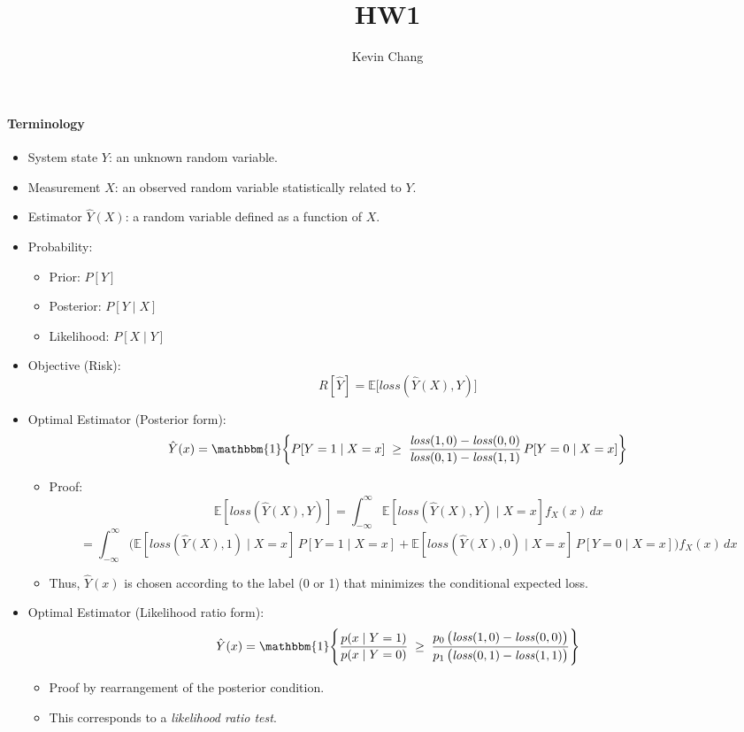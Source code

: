 \documentclass[a4paper]{article}
\title{HW1}
\author{Kevin Chang}
\begin{document}
\maketitle

\paragraph{Terminology}
\begin{itemize}
    \item System state $Y$: an unknown random variable.
    \item Measurement $X$: an observed random variable statistically related to $Y$.
    \item Estimator $\hat{Y}(X)$: a random variable defined as a function of $X$.
    \item Probability:
    \begin{itemize}
        \item Prior: $P[Y]$
        \item Posterior: $P[Y \mid X]$
        \item Likelihood: $P[X \mid Y]$
    \end{itemize}
    \item Objective (Risk):  
    \[
        R[\hat{Y}] = \mathbb{E}\big[\mathit{loss}(\hat{Y}(X), Y)\big]
    \]
    
    \item Optimal Estimator (Posterior form):  
        $$\hat{Y}(x) = \mathbbm{1}\!\left\{ 
        P[Y = 1 \mid X = x ] \;\geq\; 
        \frac{\mathit{loss}(1,0) - \mathit{loss}(0,0)}{\mathit{loss}(0,1) - \mathit{loss}(1,1)} 
        \, P[Y = 0 \mid X = x ] \right\}$$

    \begin{itemize}
        \item Proof:  
            $$\mathbb{E}[\mathit{loss}(\hat{Y}(X), Y)] = \int_{-\infty}^\infty \mathbb{E}[\mathit{loss}(\hat{Y}(X), Y) \mid X=x] f_X(x)\, dx$$
            {\tiny$$= \int_{-\infty}^\infty \Big(
            \mathbb{E}[\mathit{loss}(\hat{Y}(X), 1) \mid X=x] \, P[Y=1 \mid X=x]
            + \mathbb{E}[\mathit{loss}(\hat{Y}(X), 0) \mid X=x] \, P[Y=0 \mid X=x]
        \Big) f_X(x)\, dx$$}
        \item Thus, $\hat{Y}(x)$ is chosen according to the label (0 or 1) that minimizes the conditional expected loss.
    \end{itemize}

    \item Optimal Estimator (Likelihood ratio form):  
    \[
    \hat{Y}(x) = \mathbbm{1}\!\left\{ 
        \frac{p(x \mid Y=1)}{p(x \mid Y=0)} 
        \;\geq\;
        \frac{p_0 \, \big(\mathit{loss}(1,0) - \mathit{loss}(0,0)\big)}{p_1 \, \big(\mathit{loss}(0,1) - \mathit{loss}(1,1)\big)}
    \right\}
    \]

    \begin{itemize}
        \item Proof by rearrangement of the posterior condition.
        \item This corresponds to a \emph{likelihood ratio test}.
    \end{itemize}
\end{itemize}
\end{document}
